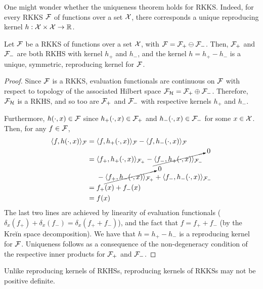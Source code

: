 One might wonder whether the uniqueness theorem  holds for RKKS.
Indeed, for every RKKS ${\mathcal F}$ of functions over a set ${\mathcal X}$, there corresponds a unique reproducing kernel $h:{\mathcal X}\times{\mathcal X}\to\mathbb{R}$.

\begin{lemma}
  Let ${\mathcal F}$ be a RKKS of functions over a set ${\mathcal X}$, with ${\mathcal F} = {\mathcal F}_+ \ominus {\mathcal F}_-$.
  Then, ${\mathcal F}_+$ and ${\mathcal F}_-$ are both RKHS with kernel $h_+$ and $h_-$, and the kernel $h = h_+ - h_-$ is a unique, symmetric, reproducing kernel for ${\mathcal F}$.  
\end{lemma}

\begin{proof}
  Since ${\mathcal F}$ is a RKKS, evaluation functionals are continuous on ${\mathcal F}$ with respect to topology of the associated Hilbert space ${\mathcal F}_{\mathcal H} = {\mathcal F}_+ \oplus {\mathcal F}_-$.
  Therefore, ${\mathcal F}_{\mathcal H}$ is a RKHS, and so too are ${\mathcal F}_+$ and ${\mathcal F}_-$ with respective kernels $h_+$ and $h_-$.
  
  Furthermore, $h(\cdot,x) \in{\mathcal F}$ since $h_+(\cdot,x) \in{\mathcal F}_+$ and $h_-(\cdot,x) \in{\mathcal F}_-$ for some $x\in{\mathcal X}$.
  Then, for any $f\in{\mathcal F}$,
  \begin{align*}
    \langle f, h(\cdot,x)\rangle_{\mathcal F} 
    ={}& \langle f, h_+(\cdot,x)\rangle_{{\mathcal F}} - \langle f, h_-(\cdot,x)\rangle_{{\mathcal F}} \\ 
    ={}& \langle f_+, h_+(\cdot,x)\rangle_{{\mathcal F}_+} - \cancelto{0}{\langle f_-, h_+(\cdot,x)\rangle_{{\mathcal F}_-}} \\
    & - \cancelto{0}{\langle f_+, h_-(\cdot,x)\rangle_{{\mathcal F}_+}} + \langle f_-, h_-(\cdot,x)\rangle_{{\mathcal F}_-} \\
    ={}& f_+(x) + f_-(x) \\
    ={}& f(x)
  \end{align*}
  The last two lines are achieved by linearity of evaluation functionals ($\delta_x(f_+) + \delta_x(f_-) = \delta_x(f_+ + f_-)$), and the fact that $f = f_+ + f_-$ (by the Kreĭn space decomposition).
  We have that $h=h_+ - h_-$ is a reproducing kernel for ${\mathcal F}$.
  Uniqueness follows as a consequence of the non-degeneracy condition of the respective inner products for ${\mathcal F}_+$ and ${\mathcal F}_-$.
\end{proof}

\begin{remark}
  Unlike reproducing kernels of RKHSs, reproducing kernels of RKKSs may not be positive definite.
\end{remark}

